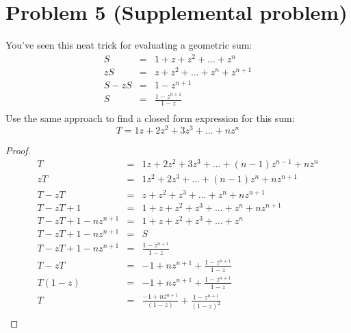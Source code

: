 \documentclass[14pt]{extarticle}
\newcommand{\dps}{\displaystyle}
\begin{document}
\section{Problem 5 (Supplemental problem)}
You’ve seen this neat trick for evaluating a geometric sum:
$$
\begin{array}{rcl}
S&=&1 + z + z^2 + \ldots + z^n\\
zS&=&z + z^2 + \ldots + z^n + z^{n+1}\\
S-zS&=&1-z^{n+1}\\
S&=&\dps\frac{1-z^{n+1}}{1-z}\\
\end{array}
$$
Use the same approach to find a closed form expression for this sum:
$$
T = 1z + 2z^2 + 3z^3 + \ldots + nz^n
$$

\begin{proof}
$$
\begin{array}{rcl}
T &=&1z + 2z^2 + 3z^3 + \ldots + (n-1)z^{n-1} + nz^n\\
zT&=&1z^2 + 2z^3 + \ldots + (n-1)z^n + nz^{n+1}\\
T-zT&=&z + z^2 + z^3 + \ldots + z^n + nz^{n+1}\\
T-zT+1&=&1 + z + z^2 + z^3 + \ldots + z^n + nz^{n+1}\\
T-zT+1 - nz^{n+1}&=&1 + z + z^2 + z^3 + \ldots + z^n\\
T-zT+1 - nz^{n+1}&=&S\\
T-zT+1 - nz^{n+1}&=&\dps\frac{1-z^{n+1}}{1-z}\\
T-zT&=&-1 + nz^{n+1} + \dps\frac{1-z^{n+1}}{1-z}\\
T(1-z)&=&-1 + nz^{n+1} + \dps\frac{1-z^{n+1}}{1-z}\\
T&=&\dps\frac{-1 + nz^{n+1}}{(1-z)} +\frac{1-z^{n+1}}{(1-z)^2}\\
\end{array}
$$
\end{proof}
\end{document}

